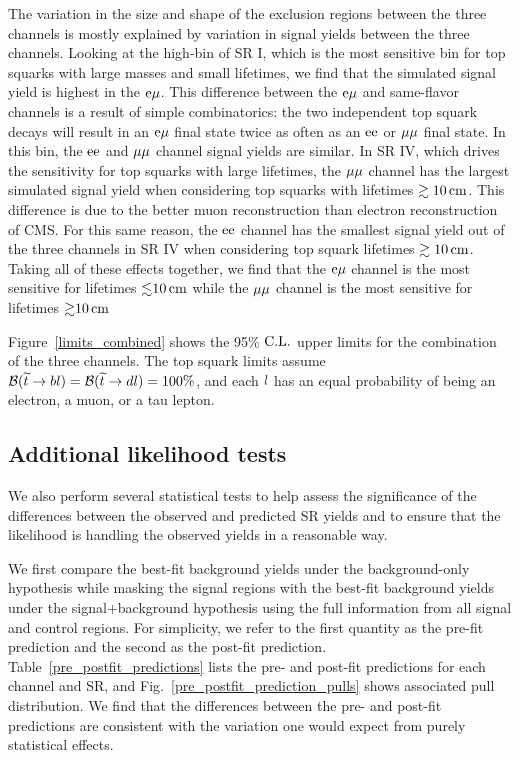 The variation in the size and shape of the exclusion regions between the three channels is mostly explained by variation in signal yields between the three channels. Looking at the high-\pt bin of SR I, which is the most sensitive bin for top squarks with large masses and small lifetimes, we find that the simulated signal yield is highest in the $\mathrm{e}{\mu}$. This difference between the $\mathrm{e}{\mu}$ and same-flavor channels is a result of simple combinatorics: the two independent top squark decays will result in an $\mathrm{e}{\mu}$ final state twice as often as an $\mathrm{e}\mathrm{e}$ or ${\mu}{\mu}$ final state. In this bin, the $\mathrm{e}\mathrm{e}$ and ${\mu}{\mu}$ channel signal yields are similar. In SR IV, which drives the sensitivity for top squarks with large lifetimes, the ${\mu}{\mu}$ channel has the largest simulated signal yield when considering top squarks with lifetimes $\gtrsim10\,\text{cm}$. This difference is due to the better muon reconstruction than electron reconstruction of CMS. For this same reason, the $\mathrm{e}\mathrm{e}$ channel has the smallest signal yield out of the three channels in SR IV when considering top squark lifetimes $\gtrsim10\,\text{cm}$. Taking all of these effects together, we find that the $\mathrm{e}{\mu}$ channel is the most sensitive for lifetimes ${\lesssim}10\,\text{cm}$ while the ${\mu}{\mu}$ channel is the most sensitive for lifetimes ${\gtrsim}10\,\text{cm}$

Figure~\ref{limits_combined} shows the 95\% $\text{C.L.}$ upper limits for the combination of the three channels. The top squark limits assume $\mathcal{B}(\widetilde{t} \to b l)=\mathcal{B}(\widetilde{t} \to d l)=100\%$, and each $l$ has an equal probability of being an electron, a muon, or a tau lepton.



\subsection{Additional likelihood tests}
We also perform several statistical tests to help assess the significance of the differences between the observed and predicted SR yields and to ensure that the likelihood is handling the observed yields in a reasonable way.

We first compare the best-fit background yields under the background-only hypothesis while masking the signal regions with the best-fit background yields under the signal+background hypothesis using the full information from all signal and control regions. For simplicity, we refer to the first quantity as the pre-fit prediction and the second as the post-fit prediction. Table~\ref{pre_postfit_predictions} lists the pre- and post-fit predictions for each channel and SR, and Fig.~\ref{pre_postfit_prediction_pulls} shows associated pull distribution. We find that the differences between the pre- and post-fit predictions are consistent with the variation one would expect from purely statistical effects.

